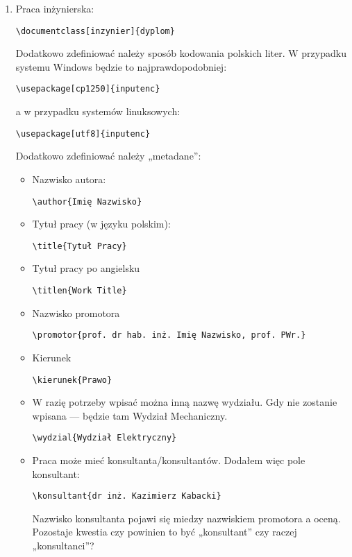 \begin{enumerate}
\begin{verbatim}
\end{verbatim}
\item
Praca inżynierska:
\begin{verbatim}
\documentclass[inzynier]{dyplom}
\end{verbatim}
Dodatkowo zdefiniować należy sposób kodowania polskich liter. W przypadku systemu Windows będzie to najprawdopodobniej:
\begin{verbatim}
\usepackage[cp1250]{inputenc}
\end{verbatim}
a w przypadku systemów linuksowych:
\begin{verbatim}
\usepackage[utf8]{inputenc}
\end{verbatim}

Dodatkowo zdefiniować należy „metadane”:
\begin{itemize}
\item
Nazwisko autora:
\begin{verbatim}
\author{Imię Nazwisko}
\end{verbatim}
\item
Tytuł pracy (w języku polskim):
\begin{verbatim}
\title{Tytuł Pracy}
\end{verbatim}
\item
Tytuł pracy po angielsku
\begin{verbatim}
\titlen{Work Title}
\end{verbatim}
\item
Nazwisko promotora
\begin{verbatim}
\promotor{prof. dr hab. inż. Imię Nazwisko, prof. PWr.}
\end{verbatim}
\item
Kierunek
\begin{verbatim}
\kierunek{Prawo}
\end{verbatim}
\item
W razię potrzeby wpisać można inną nazwę wydziału. Gdy nie zostanie wpisana — będzie tam Wydział Mechaniczny.
\begin{verbatim}
\wydzial{Wydział Elektryczny}
\end{verbatim}
\item
Praca może mieć konsultanta/konsultantów. Dodałem więc pole konsultant:
\begin{verbatim}
\konsultant{dr inż. Kazimierz Kabacki}
\end{verbatim}
Nazwisko konsultanta pojawi się miedzy nazwiskiem promotora a oceną. Pozostaje kwestia czy powinien to być „konsultant” czy raczej „konsultanci”?


\end{itemize}
\end{enumerate}

